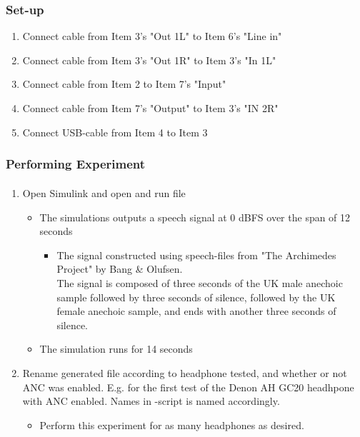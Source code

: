 	\subsubsection{Set-up}
	\begin{enumerate}
		\item Connect cable from Item 3's "Out 1L" to Item 6's "Line in"
		\item Connect cable from Item 3's "Out 1R" to Item 3's "In 1L"
		\item Connect cable from Item 2 to Item 7's "Input"
		\item Connect cable from Item 7's "Output" to Item 3's "IN 2R"
		\item Connect USB-cable from Item 4 to Item 3
	\end{enumerate}

	\subsubsection{Performing Experiment}
	\begin{enumerate}
		\item Open Simulink\textsuperscript{\textregistered} and open and run file 
		\begin{itemize} 
			\item The simulations outputs a speech signal at 0 dBFS over the span of 12 seconds
			\begin{itemize}
				\item [] The signal constructed using speech-files from "The Archimedes Project" by Bang \& Olufsen. \\
				The signal is composed of three seconds of the UK male anechoic sample followed by three seconds of silence, followed by the UK female anechoic sample, and ends with another three seconds of silence.
			\end{itemize}
			\item The simulation runs for 14 seconds
		\end{itemize}
		\item Rename generated file  according to headphone tested, and whether or not ANC was enabled. E.g.  for the first test of the Denon AH GC20 headhpone with ANC enabled. Names in -script is named accordingly.
				\begin{itemize}
			\item[] Perform this experiment for as many headphones as desired.
		\end{itemize}
	\end{enumerate}
	
